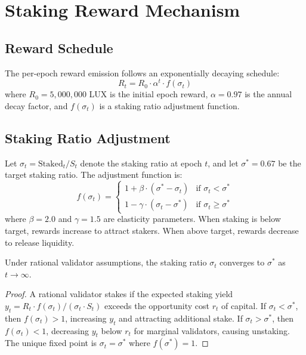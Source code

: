 \section{Staking Reward Mechanism}
\label{sec:staking}

\subsection{Reward Schedule}

The per-epoch reward emission follows an exponentially decaying schedule:
\begin{equation}\label{eq:reward_schedule}
    R_t = R_0 \cdot \alpha^t \cdot f(\sigma_t)
\end{equation}
where $R_0 = 5{,}000{,}000$ LUX is the initial epoch reward, $\alpha = 0.97$ is the annual decay factor, and $f(\sigma_t)$ is a staking ratio adjustment function.

\subsection{Staking Ratio Adjustment}

Let $\sigma_t = \text{Staked}_t / S_t$ denote the staking ratio at epoch $t$, and let $\sigma^* = 0.67$ be the target staking ratio. The adjustment function is:
\begin{equation}\label{eq:staking_adj}
    f(\sigma_t) = \begin{cases}
        1 + \beta \cdot (\sigma^* - \sigma_t) & \text{if } \sigma_t < \sigma^* \\
        1 - \gamma \cdot (\sigma_t - \sigma^*) & \text{if } \sigma_t \geq \sigma^*
    \end{cases}
\end{equation}
where $\beta = 2.0$ and $\gamma = 1.5$ are elasticity parameters. When staking is below target, rewards increase to attract stakers. When above target, rewards decrease to release liquidity.

\begin{proposition}
Under rational validator assumptions, the staking ratio $\sigma_t$ converges to $\sigma^*$ as $t \to \infty$.
\end{proposition}

\begin{proof}
A rational validator stakes if the expected staking yield $y_t = R_t \cdot f(\sigma_t) / (\sigma_t \cdot S_t)$ exceeds the opportunity cost $r_t$ of capital. If $\sigma_t < \sigma^*$, then $f(\sigma_t) > 1$, increasing $y_t$ and attracting additional stake. If $\sigma_t > \sigma^*$, then $f(\sigma_t) < 1$, decreasing $y_t$ below $r_t$ for marginal validators, causing unstaking. The unique fixed point is $\sigma_t = \sigma^*$ where $f(\sigma^*) = 1$.
\end{proof}

